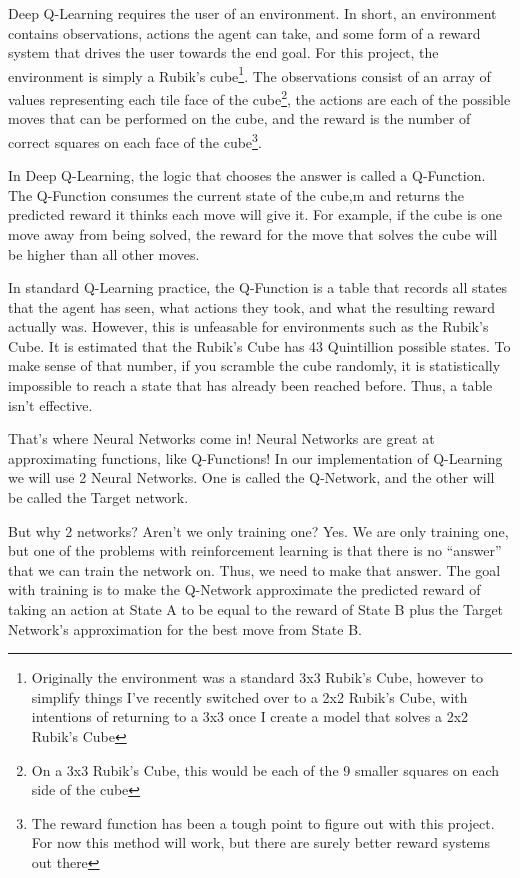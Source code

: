 \documentclass[12pt]{article}
\begin{document}
Deep Q-Learning requires the user of an environment. In short, an environment contains observations, actions the agent can take, and some form of a reward system that drives the user towards the end goal. For this project, the environment is simply a Rubik's cube\footnote{Originally the environment was a standard 3x3 Rubik's Cube, however to simplify things I've recently switched over to a 2x2 Rubik's Cube, with intentions of returning to a 3x3 once I create a model that solves a 2x2 Rubik's Cube}. The observations consist of an array of values representing each tile face of the cube\footnote{On a 3x3 Rubik's Cube, this would be each of the 9 smaller squares on each side of the cube}, the actions are each of the possible moves that can be performed on the cube, and the reward is the number of correct squares on each face of the cube\footnote{The reward function has been a tough point to figure out with this project. For now this method will work, but there are surely better reward systems out there}.

In Deep Q-Learning, the logic that chooses the answer is called a Q-Function. The Q-Function consumes the current state of the cube,m and returns the predicted reward it thinks each move will give it. For example, if the cube is one move away from being solved, the reward for the move that solves the cube will be higher than all other moves.

In standard Q-Learning practice, the Q-Function is a table that records all states that the agent has seen, what actions they took, and what the resulting reward actually was. However, this is unfeasable for environments such as the Rubik's Cube. It is estimated that the Rubik's Cube has 43 Quintillion possible states. To make sense of that number, if you scramble the cube randomly, it is statistically impossible to reach a state that has already been reached before. Thus, a table isn't effective.

That's where Neural Networks come in! Neural Networks are great at approximating functions, like Q-Functions! In our implementation of Q-Learning we will use 2 Neural Networks. One is called the Q-Network, and the other will be called the Target network.

But why 2 networks? Aren't we only training one? Yes. We are only training one, but one of the problems with reinforcement learning is that there is no ``answer'' that we can train the network on. Thus, we need to make that answer. The goal with training is to make the Q-Network approximate the predicted reward of taking an action at State A to be equal to the reward of State B plus the Target Network's approximation for the best move from State B.
\end{document}
